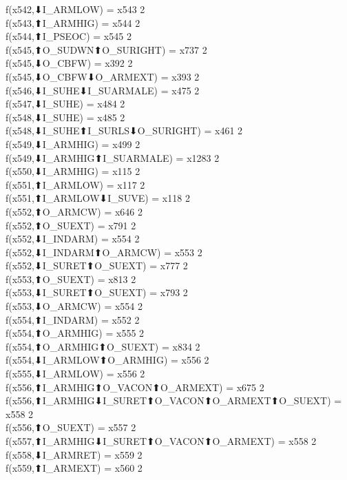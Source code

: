 f(x542,⬇I_ARMLOW) = x543 {2} \\
f(x543,⬆I_ARMHIG) = x544 {2} \\
f(x544,⬆I_PSEOC) = x545 {2} \\
f(x545,⬆O_SUDWN⬆O_SURIGHT) = x737 {2} \\
f(x545,⬇O_CBFW) = x392 {2} \\
f(x545,⬇O_CBFW⬇O_ARMEXT) = x393 {2} \\
f(x546,⬇I_SUHE⬇I_SUARMALE) = x475 {2} \\
f(x547,⬇I_SUHE) = x484 {2} \\
f(x548,⬇I_SUHE) = x485 {2} \\
f(x548,⬇I_SUHE⬆I_SURLS⬇O_SURIGHT) = x461 {2} \\
f(x549,⬇I_ARMHIG) = x499 {2} \\
f(x549,⬇I_ARMHIG⬆I_SUARMALE) = x1283 {2} \\
f(x550,⬇I_ARMHIG) = x115 {2} \\
f(x551,⬆I_ARMLOW) = x117 {2} \\
f(x551,⬆I_ARMLOW⬇I_SUVE) = x118 {2} \\
f(x552,⬆O_ARMCW) = x646 {2} \\
f(x552,⬆O_SUEXT) = x791 {2} \\
f(x552,⬇I_INDARM) = x554 {2} \\
f(x552,⬇I_INDARM⬆O_ARMCW) = x553 {2} \\
f(x552,⬇I_SURET⬆O_SUEXT) = x777 {2} \\
f(x553,⬆O_SUEXT) = x813 {2} \\
f(x553,⬇I_SURET⬆O_SUEXT) = x793 {2} \\
f(x553,⬇O_ARMCW) = x554 {2} \\
f(x554,⬆I_INDARM) = x552 {2} \\
f(x554,⬆O_ARMHIG) = x555 {2} \\
f(x554,⬆O_ARMHIG⬆O_SUEXT) = x834 {2} \\
f(x554,⬇I_ARMLOW⬆O_ARMHIG) = x556 {2} \\
f(x555,⬇I_ARMLOW) = x556 {2} \\
f(x556,⬆I_ARMHIG⬆O_VACON⬆O_ARMEXT) = x675 {2} \\
f(x556,⬆I_ARMHIG⬇I_SURET⬆O_VACON⬆O_ARMEXT⬆O_SUEXT) = x558 {2} \\
f(x556,⬆O_SUEXT) = x557 {2} \\
f(x557,⬆I_ARMHIG⬇I_SURET⬆O_VACON⬆O_ARMEXT) = x558 {2} \\
f(x558,⬇I_ARMRET) = x559 {2} \\
f(x559,⬆I_ARMEXT) = x560 {2} \\
